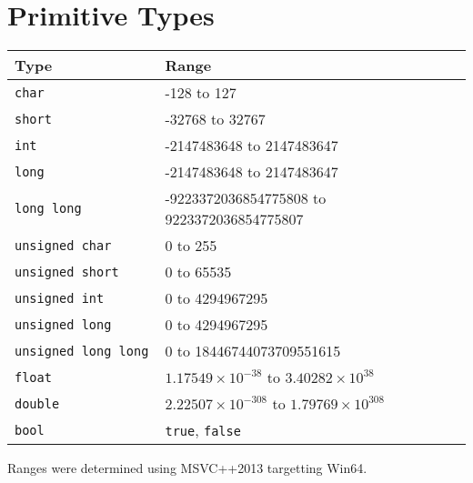 \section{Primitive Types}
\begin{center}
  \begin{tabular}{ll}
    \textbf{Type} & \textbf{Range} \\
    \toprule
    \tt char & -128 to 127 \\
    \tt short & -32768 to 32767 \\
    \tt int & -2147483648 to 2147483647 \\
    \tt long & -2147483648 to 2147483647 \\
    \tt long long & -9223372036854775808 to 9223372036854775807 \\
    \midrule
    \tt unsigned char & 0 to 255 \\
    \tt unsigned short & 0 to 65535 \\
    \tt unsigned int & 0 to 4294967295 \\
    \tt unsigned long & 0 to 4294967295 \\
    \tt unsigned long long & 0 to 18446744073709551615 \\
    \midrule
    \tt float & $1.17549 \times 10^{-38}$ to $3.40282 \times 10^{38}$ \\
    \tt double & $2.22507 \times 10^{-308}$ to $1.79769 \times 10^{308}$ \\
    \midrule
    \tt bool & {\tt true}, {\tt false} \\
    \bottomrule
  \end{tabular}
\end{center}
Ranges were determined using MSVC++2013 targetting Win64.
\begin{extra}
\end{extra}


